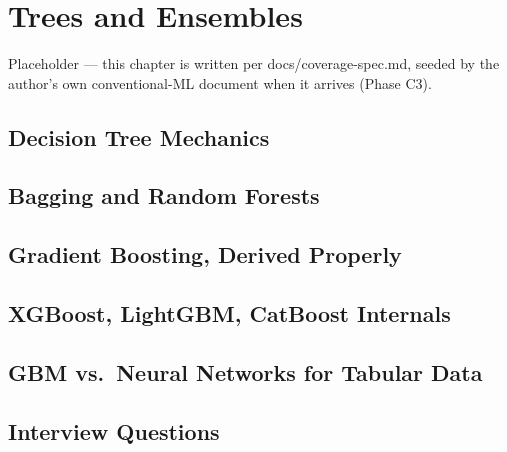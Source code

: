 \chapter{Trees and Ensembles}
\label{cml:chap:trees_ensembles}

\begin{tldr}
Placeholder — this chapter is written per docs/coverage-spec.md, seeded by the author's own conventional-ML document when it arrives (Phase C3).
\end{tldr}

\section{Decision Tree Mechanics}

\section{Bagging and Random Forests}

\section{Gradient Boosting, Derived Properly}

\section{XGBoost, LightGBM, CatBoost Internals}

\section{GBM vs.\ Neural Networks for Tabular Data}

\section{Interview Questions}

